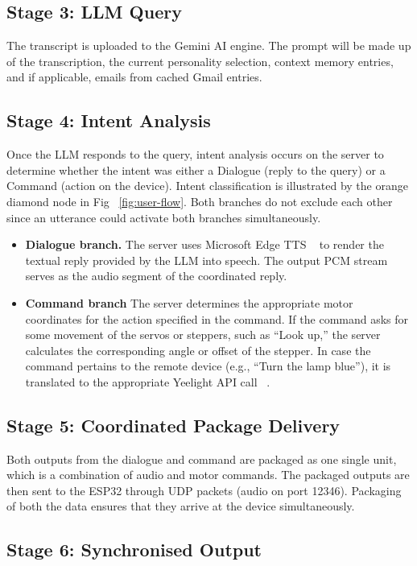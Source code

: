 \subsection{Stage 3: LLM Query}

The transcript is uploaded to the Gemini AI engine. The prompt will be made up of the transcription, the current personality selection, context memory entries, and if applicable, emails from cached Gmail entries.

\subsection{Stage 4: Intent Analysis}

Once the LLM responds to the query, intent analysis occurs on the server to determine whether the intent was either a Dialogue (reply to the query) or a Command (action on the device). Intent classification is illustrated by the orange diamond node in Fig ~\ref{fig:user-flow}. Both branches do not exclude each other since an utterance could activate both branches simultaneously.
\begin{itemize}
 \item \textbf{Dialogue branch.} The server uses Microsoft Edge TTS ~\cite{edge-tts} to render the textual reply provided by the LLM into speech. The output PCM stream serves as the audio segment of the coordinated reply.
\item \textbf{Command branch} The server determines the appropriate motor coordinates for the action specified in the command. If the command asks for some movement of the servos or steppers, such as “Look up,” the server calculates the corresponding angle or offset of the stepper. In case the command pertains to the remote device (e.g., “Turn the lamp blue”), it is translated to the appropriate Yeelight API call ~\cite{yeelight}.
\end{itemize}

\subsection{Stage 5: Coordinated Package Delivery}

Both outputs from the dialogue and command are packaged as one single unit, which is a combination of audio and motor commands. The packaged outputs are then sent to the ESP32 through UDP packets (audio on port 12346). Packaging of both the data ensures that they arrive at the device simultaneously.

\subsection{Stage 6: Synchronised Output}

